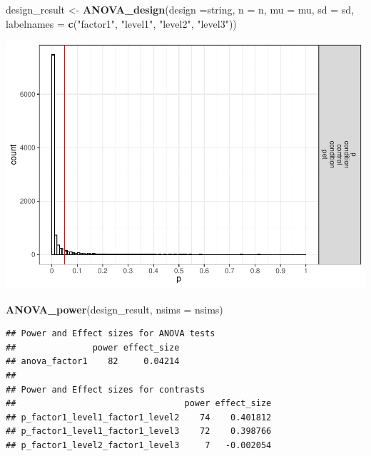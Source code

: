\documentclass[]{book}
\newenvironment{Shaded}{\begin{snugshade}}{\end{snugshade}}
\newcommand{\DataTypeTok}[1]{\textcolor[rgb]{0.13,0.29,0.53}{#1}}
\newcommand{\KeywordTok}[1]{\textcolor[rgb]{0.13,0.29,0.53}{\textbf{#1}}}
\newcommand{\NormalTok}[1]{#1}
\newcommand{\StringTok}[1]{\textcolor[rgb]{0.31,0.60,0.02}{#1}}
\begin{document}
\begin{Shaded}
\begin{Highlighting}[]
\NormalTok{design_result <-}\StringTok{ }\KeywordTok{ANOVA_design}\NormalTok{(}\DataTypeTok{design =}\NormalTok{string,}
                   \DataTypeTok{n =}\NormalTok{ n, }
                   \DataTypeTok{mu =}\NormalTok{ mu, }
                   \DataTypeTok{sd =}\NormalTok{ sd, }
                   \DataTypeTok{labelnames =} \KeywordTok{c}\NormalTok{(}\StringTok{"factor1"}\NormalTok{, }\StringTok{"level1"}\NormalTok{, }\StringTok{"level2"}\NormalTok{, }\StringTok{"level3"}\NormalTok{))}
\end{Highlighting}
\end{Shaded}

\includegraphics{SuperpowerValidation_files/figure-latex/unnamed-chunk-25-1.pdf}

\begin{Shaded}
\begin{Highlighting}[]
\KeywordTok{ANOVA_power}\NormalTok{(design_result, }\DataTypeTok{nsims =}\NormalTok{ nsims)}
\end{Highlighting}
\end{Shaded}

\begin{verbatim}
## Power and Effect sizes for ANOVA tests
##               power effect_size
## anova_factor1    82     0.04214
## 
## Power and Effect sizes for contrasts
##                                 power effect_size
## p_factor1_level1_factor1_level2    74    0.401812
## p_factor1_level1_factor1_level3    72    0.398766
## p_factor1_level2_factor1_level3     7   -0.002054
\end{verbatim}
\end{document}
